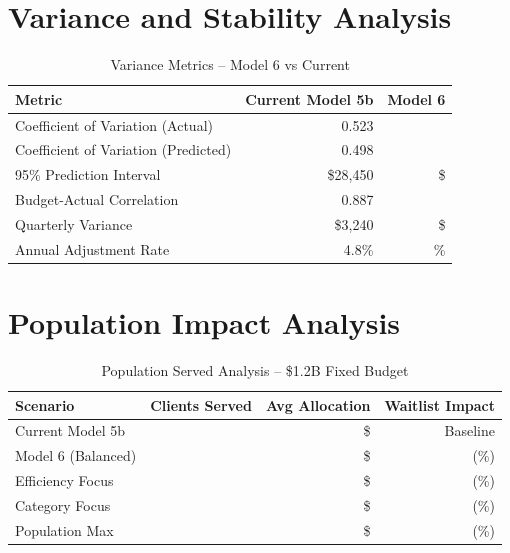 \section{Variance and Stability Analysis}

\begin{table}[h]
\centering
\caption{Variance Metrics -- Model 6 vs Current}
\begin{tabular}{lrr}
\toprule
\textbf{Metric} & \textbf{Current Model 5b} & \textbf{Model 6} \\
\midrule
Coefficient of Variation (Actual) & 0.523 & \ModelSixCVActual{} \\
Coefficient of Variation (Predicted) & 0.498 & \ModelSixCVPredicted{} \\
95\% Prediction Interval & \$28,450 & \$\ModelSixPredictionInterval{} \\
Budget-Actual Correlation & 0.887 & \ModelSixBudgetActualCorr{} \\
Quarterly Variance & \$3,240 & \$\ModelSixQuarterlyVariance{} \\
Annual Adjustment Rate & 4.8\% & \ModelSixAnnualAdjustmentRate{}\% \\
\bottomrule
\end{tabular}
\end{table}

\section{Population Impact Analysis}

\begin{table}[h]
\centering
\caption{Population Served Analysis -- \$1.2B Fixed Budget}
\begin{tabular}{lrrr}
\toprule
\textbf{Scenario} & \textbf{Clients Served} & \textbf{Avg Allocation} & \textbf{Waitlist Impact} \\
\midrule
Current Model 5b & \ModelSixPopcurrentbaselineClients{} & \$\ModelSixPopcurrentbaselineAvgAlloc{} & Baseline \\
Model 6 (Balanced) & \ModelSixPopmodelbalancedClients{} & \$\ModelSixPopmodelbalancedAvgAlloc{} & \ModelSixPopmodelbalancedWaitlistChange{} (\ModelSixPopmodelbalancedWaitlistPct{}\%) \\
Efficiency Focus & \ModelSixPopmodelefficiencyClients{} & \$\ModelSixPopmodelefficiencyAvgAlloc{} & \ModelSixPopmodelefficiencyWaitlistChange{} (\ModelSixPopmodelefficiencyWaitlistPct{}\%) \\
Category Focus & \ModelSixPopcategoryfocusedClients{} & \$\ModelSixPopcategoryfocusedAvgAlloc{} & \ModelSixPopcategoryfocusedWaitlistChange{} (\ModelSixPopcategoryfocusedWaitlistPct{}\%) \\
Population Max & \ModelSixPoppopulationmaximizedClients{} & \$\ModelSixPoppopulationmaximizedAvgAlloc{} & \ModelSixPoppopulationmaximizedWaitlistChange{} (\ModelSixPoppopulationmaximizedWaitlistPct{}\%) \\
\bottomrule
\end{tabular}
\end{table}


